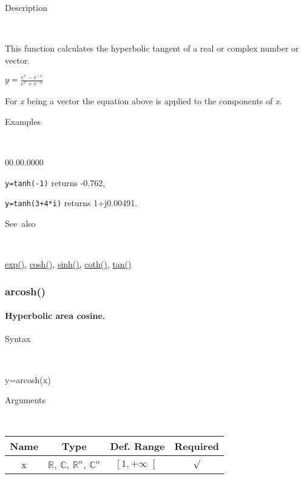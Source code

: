 \begin{description}
\item [Description]~
\end{description}
This function calculates the hyperbolic tangent of a real or complex
number or vector.

\medskip{}
$y={\displaystyle \frac{e^{x}-e^{-x}}{e^{x}+e^{-x}}}$ 
\medskip{}

\noindent For \textit{x} being a vector the equation above is applied
to the components of \textit{x}.

\begin{description}
\item [Examples]~
\end{description}
\begin{lyxlist}{00.00.0000}
\item [\texttt{y=tanh(-1)}]returns -0.762,
\item [\texttt{y=tanh(3+4{*}i)}]returns 1+j0.00491.
\end{lyxlist}
\begin{description}
\item [See~also]~
\end{description}
\textcolor{blue}{\hyperlink{exp}{exp()}}\textcolor{black}{,} \textcolor{blue}{\hyperlink{cosh}{cosh()}}\textcolor{black}{,}
\textcolor{blue}{\hyperlink{sinh}{sinh()}}\textcolor{black}{,} \textcolor{blue}{\hyperlink{coth}{coth()}}\textcolor{black}{,}
\textcolor{blue}{\hyperlink{tan}{tan()}}


\newpage
{}


\subsubsection*{\hypertarget{arcosh}{}{\Large arcosh()}}


\paragraph{\label{par:Hyperbolic-area-cosine}Hyperbolic area cosine.}

\begin{description}
\item [Syntax]~
\end{description}
y=arcosh(x)

\begin{description}
\item [Arguments]~
\end{description}
\begin{tabular}{|c|c|c|c|}
\hline 
Name&
Type&
Def. Range&
Required\tabularnewline
\hline
\hline 
x&
$\mathbb{R}$, $\mathbb{C}$, $\mathbb{R}^{n}$, $\mathbb{C}^{n}$&
$\left[1,+\infty\right[$&
$\surd$\tabularnewline
\hline
\end{tabular}


